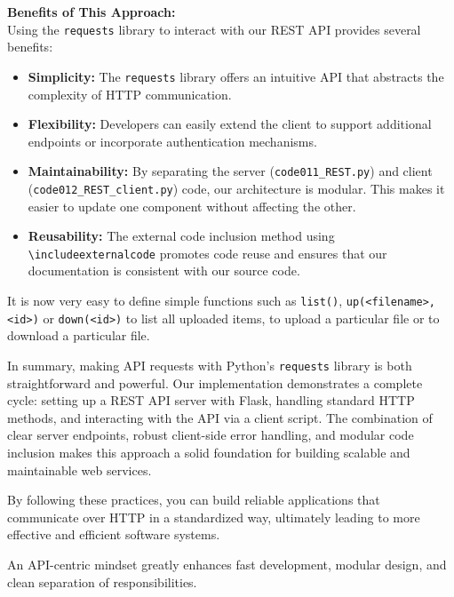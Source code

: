 \bigskip

\textbf{Benefits of This Approach:}\\
Using the \texttt{requests} library to interact with our REST API provides several benefits:
\begin{itemize}
  \item \textbf{Simplicity:} The \texttt{requests} library offers an intuitive API that abstracts the complexity of HTTP communication.
  \item \textbf{Flexibility:} Developers can easily extend the client to support additional endpoints or incorporate authentication mechanisms.
  \item \textbf{Maintainability:} By separating the server (\texttt{code011\_REST.py}) and client (\texttt{code012\_REST\_client.py}) code, our architecture is modular. This makes it easier to update one component without affecting the other.
  \item \textbf{Reusability:} The external code inclusion method using \texttt{\textbackslash includeexternalcode} promotes code reuse and ensures that our documentation is consistent with our source code.
\end{itemize}

It is now very easy to define simple functions such as \texttt{list()}, \texttt{up(<filename>,<id>)} or \texttt{down(<id>)} to list all uploaded items, to upload a particular file or to download a particular file. 

\bigskip
In summary, making API requests with Python’s \texttt{requests} library is both straightforward and powerful. Our implementation demonstrates a complete cycle: setting up a REST API server with Flask, handling standard HTTP methods, and interacting with the API via a client script. The combination of clear server endpoints, robust client-side error handling, and modular code inclusion makes this approach a solid foundation for building scalable and maintainable web services.

\bigskip

By following these practices, you can build reliable applications that communicate over HTTP in a standardized way, ultimately leading to more effective and efficient software systems.

\begin{recommendationbox}
An API-centric mindset greatly enhances fast development, modular design, and clean separation of responsibilities.
\end{recommendationbox}

